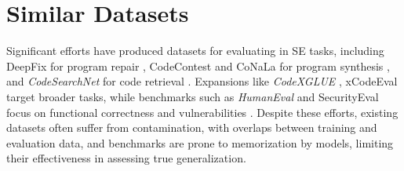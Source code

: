 \section{Similar Datasets}\label{sec:similar_datasets}


Significant efforts have produced datasets for evaluating \llms in SE tasks, including DeepFix for program repair \cite{gupta_deepfix_2017}, CodeContest and CoNaLa for program synthesis \cite{li_competition-level_2022, yin2018mining}, and \textit{CodeSearchNet} for code retrieval \cite{husain2019codesearchnet}. Expansions like \textit{CodeXGLUE} \cite{lu_codexglue_2021}, xCodeEval \cite{khan_xcodeeval_2023} target broader tasks, while benchmarks such as \textit{HumanEval} and SecurityEval focus on functional correctness and vulnerabilities \cite{chen_evaluating_2021, secEval}. Despite these efforts, existing datasets often suffer from contamination\cite{jain_livecodebench_2024,yadav_pythonsaga_2024}, with overlaps between training and evaluation data, and benchmarks are prone to memorization by models\cite{ramos2024largelanguagemodelsmemorizing}, limiting their effectiveness in assessing true generalization.

